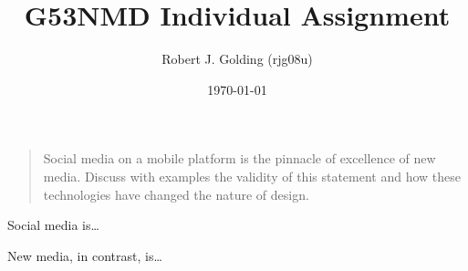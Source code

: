 \documentclass[a4paper]{article}
\title{G53NMD Individual Assignment}
\author{Robert J. Golding (rjg08u)} \date{\today}
\begin{document}
    \maketitle

    \begin{quote}
        Social media on a mobile platform is the pinnacle of excellence of new
        media. Discuss with examples the validity of this statement and how these
        technologies have changed the nature of design.
    \end{quote}

    Social media is\dots \cite{kaplan2010}

    New media, in contrast, is\dots

    
    
\end{document}
